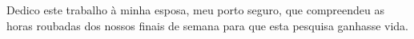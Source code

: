 Dedico este trabalho à minha esposa, meu porto seguro, que compreendeu as horas roubadas dos nossos finais de semana para que esta pesquisa ganhasse vida.